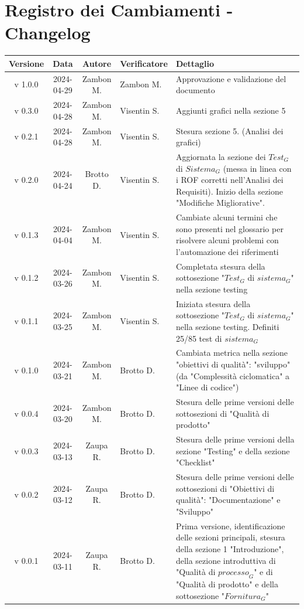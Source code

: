\documentclass[12pt, oneside]{article}
\begin{document}
\section*{Registro dei Cambiamenti - Changelog}
\begin{tabular}{|c|c|c|p{3cm}|p{6cm}|}
\hline
\textbf{Versione} & \textbf{Data} & \textbf{Autore} & \textbf{Verificatore} & \textbf{Dettaglio} \\
\hline
v 1.0.0 & 2024-04-29 & Zambon M. & Zambon M. & Approvazione e validazione del documento\\
\hline
v 0.3.0 & 2024-04-28 & Zambon M. & Visentin S. & Aggiunti grafici nella sezione 5\\
\hline
v 0.2.1 & 2024-04-28 & Zambon M. & Visentin S. & Stesura sezione 5. (Analisi dei grafici)\\
\hline
v 0.2.0 & 2024-04-24 & Brotto D. & Visentin S. & Aggiornata la sezione dei $\textit{Test}_G$ di $\textit{Sistema}_G$ (messa in linea con i ROF corretti nell'Analisi dei Requisiti).
\newline
Inizio della sezione "Modifiche Migliorative".\\
\hline
v 0.1.3 & 2024-04-04 & Zambon M. & Visentin S. & Cambiate alcuni termini che sono presenti nel glossario per risolvere alcuni problemi con l'automazione dei riferimenti\\
\hline
v 0.1.2 & 2024-03-26 & Zambon M. & Visentin S. & Completata stesura della sottosezione "$\textit{Test}_G$ di $\textit{sistema}_G$" nella sezione testing\\
\hline
v 0.1.1 & 2024-03-25 & Zambon M. & Visentin S. & Iniziata stesura della sottosezione "$\textit{Test}_G$ di $\textit{sistema}_G$" nella sezione testing. Definiti 25/85 test di $\textit{sistema}_G$\\
\hline
v 0.1.0 & 2024-03-21 & Zambon M. & Brotto D. & Cambiata metrica nella sezione "obiettivi di qualità": "sviluppo" (da "Complessità ciclomatica" a "Linee di codice")\\
\hline
v 0.0.4 & 2024-03-20 & Zambon M. & Brotto D. & Stesura delle prime versioni delle sottosezioni di "Qualità di prodotto"\\
\hline
v 0.0.3 & 2024-03-13 & Zaupa R. & Brotto D. & Stesura delle prime versioni della sezione "Testing" e della sezione "Checklist"\\
\hline
v 0.0.2 & 2024-03-12 & Zaupa R. & Brotto D. & Stesura delle prime versioni delle sottosezioni di "Obiettivi di qualità": "Documentazione" e "Sviluppo"\\
\hline
v 0.0.1 & 2024-03-11 & Zaupa R. & Brotto D. & Prima versione, identificazione delle sezioni principali, stesura della sezione 1 "Introduzione", della sezione introduttiva di "Qualità di $\textit{processo}_G$" e di "Qualità di prodotto" e della sottosezione "$\textit{Fornitura}_G$" \\
\hline
\end{tabular}
\newpage


\tableofcontents
\newpage

\newpage

\newpage

\newpage

\newpage

\newpage

\end{document}
